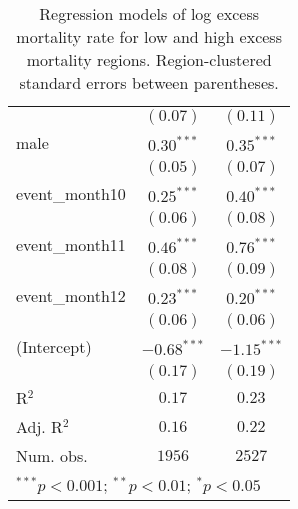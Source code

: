 \begin{table}
\begin{center}
\begin{tabular}{l c c}
                     & $(0.07)$      & $(0.11)$      \\
male                 & $0.30^{***}$  & $0.35^{***}$  \\
                     & $(0.05)$      & $(0.07)$      \\
event\_month10       & $0.25^{***}$  & $0.40^{***}$  \\
                     & $(0.06)$      & $(0.08)$      \\
event\_month11       & $0.46^{***}$  & $0.76^{***}$  \\
                     & $(0.08)$      & $(0.09)$      \\
event\_month12       & $0.23^{***}$  & $0.20^{***}$  \\
                     & $(0.06)$      & $(0.06)$      \\
(Intercept)          & $-0.68^{***}$ & $-1.15^{***}$ \\
                     & $(0.17)$      & $(0.19)$      \\
\hline
R$^2$                & $0.17$        & $0.23$        \\
Adj. R$^2$           & $0.16$        & $0.22$        \\
Num. obs.            & $1956$        & $2527$        \\
\hline
\multicolumn{3}{l}{\scriptsize{$^{***}p<0.001$; $^{**}p<0.01$; $^{*}p<0.05$}}
\end{tabular}
\caption{Regression models of log excess mortality rate for low and high excess mortality regions. Region-clustered standard errors between parentheses.}
\label{tab:hilomodels}
\end{center}
\end{table}
